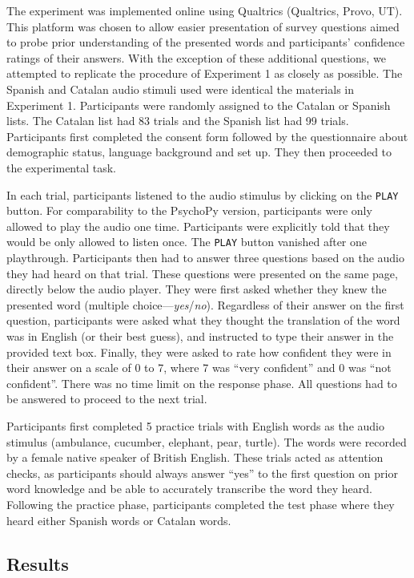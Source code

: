 \documentclass[
  man,
  longtable,
  nolmodern,
  notxfonts,
  notimes,
  colorlinks=true,linkcolor=blue,citecolor=blue,urlcolor=blue]{apa7}
\begin{document}
The experiment was implemented online using Qualtrics (Qualtrics, Provo,
UT). This platform was chosen to allow easier presentation of survey
questions aimed to probe prior understanding of the presented words and
participants' confidence ratings of their answers. With the exception of
these additional questions, we attempted to replicate the procedure of
Experiment 1 as closely as possible. The Spanish and Catalan audio
stimuli used were identical the materials in Experiment 1. Participants
were randomly assigned to the Catalan or Spanish lists. The Catalan list
had 83 trials and the Spanish list had 99 trials. Participants first
completed the consent form followed by the questionnaire about
demographic status, language background and set up. They then proceeded
to the experimental task.

In each trial, participants listened to the audio stimulus by clicking
on the \texttt{PLAY} button. For comparability to the PsychoPy version,
participants were only allowed to play the audio one time. Participants
were explicitly told that they would be only allowed to listen once. The
\texttt{PLAY} button vanished after one playthrough. Participants then
had to answer three questions based on the audio they had heard on that
trial. These questions were presented on the same page, directly below
the audio player. They were first asked whether they knew the presented
word (multiple choice---\emph{yes}/\emph{no}). Regardless of their
answer on the first question, participants were asked what they thought
the translation of the word was in English (or their best guess), and
instructed to type their answer in the provided text box. Finally, they
were asked to rate how confident they were in their answer on a scale of
0 to 7, where 7 was ``very confident'' and 0 was ``not confident''.
There was no time limit on the response phase. All questions had to be
answered to proceed to the next trial.

Participants first completed 5 practice trials with English words as the
audio stimulus (ambulance, cucumber, elephant, pear, turtle). The words
were recorded by a female native speaker of British English. These
trials acted as attention checks, as participants should always answer
``yes'' to the first question on prior word knowledge and be able to
accurately transcribe the word they heard. Following the practice phase,
participants completed the test phase where they heard either Spanish
words or Catalan words.

\subsection{Results}\label{results-2}
\end{document}
